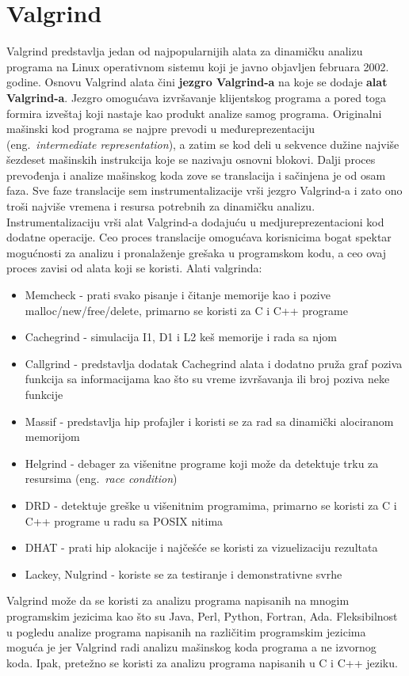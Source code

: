 \documentclass[a4paper]{article}
\begin{document}
\section{Valgrind}
Valgrind predstavlja jedan od najpopularnijih alata za dinamičku analizu programa na Linux operativnom sistemu koji je javno objavljen februara 2002. godine. Osnovu Valgrind alata čini \textbf{jezgro Valgrind-a} na koje se dodaje \textbf{alat Valgrind-a}. Jezgro omogućava izvršavanje klijentskog programa a pored toga formira izveštaj koji nastaje kao produkt analize samog programa. Originalni mašinski kod programa se najpre prevodi u međureprezentaciju (eng.~{\em intermediate representation}), a zatim se kod deli u sekvence dužine najviše šezdeset mašinskih instrukcija koje se nazivaju osnovni blokovi. Dalji proces prevođenja i analize mašinskog koda zove se translacija i sačinjena je od osam faza. Sve faze translacije sem instrumentalizacije vrši jezgro Valgrind-a i zato ono troši najviše vremena i resursa potrebnih za dinamičku analizu. Instrumentalizaciju vrši alat Valgrind-a dodajuću u medjureprezentacioni kod dodatne operacije. Ceo proces translacije omogućava korisnicima bogat spektar mogućnosti za analizu i pronalaženje grešaka u programskom kodu, a ceo ovaj proces zavisi od alata koji se koristi.\cite{valgrind-doc} 
Alati valgrinda:\cite{valgrind-tools}
\begin{itemize}
    \item Memcheck - prati svako pisanje i čitanje memorije kao i pozive malloc/new/free/delete, primarno se koristi za C i C++ programe
    \item Cachegrind - simulacija I1, D1 i L2 keš memorije i rada sa njom
    \item Callgrind - predstavlja dodatak Cachegrind alata i dodatno pruža graf poziva funkcija sa informacijama kao što su vreme izvršavanja ili broj poziva neke funkcije
    \item Massif - predstavlja hip profajler i koristi se za rad sa dinamički alociranom memorijom
    \item Helgrind - debager za višenitne programe koji može da detektuje trku za resursima (eng.~{\em race condition})
    \item DRD - detektuje greške u višenitnim programima, primarno se koristi za C i C++ programe u radu sa POSIX nitima
    \item DHAT - prati hip alokacije i najčešće se koristi za vizuelizaciju rezultata
    \item Lackey, Nulgrind - koriste se za testiranje i demonstrativne svrhe
\end{itemize}
\par
Valgrind može da se koristi za analizu programa napisanih na mnogim programskim jezicima kao što su Java, Perl, Python, Fortran, Ada. Fleksibilnost u pogledu analize programa napisanih na različitim programskim jezicima moguća je jer Valgrind radi analizu mašinskog koda programa a ne izvornog koda. Ipak, pretežno se koristi za analizu programa napisanih u C i C++ jeziku.\cite{valgrind-about}
\end{document}
